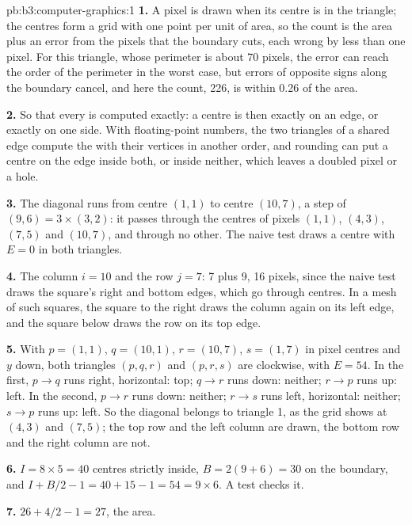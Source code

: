 \begin{solution}{pb:b3:computer-graphics:1}
\textbf{1.} A pixel is drawn when its centre is in the triangle; the centres form a grid with one point per unit of area, so the count is the area plus an error from the pixels that the boundary cuts, each wrong by less than one pixel. For this triangle, whose perimeter is about 70 pixels, the error can reach the order of the perimeter in the worst case, but errors of opposite signs along the boundary cancel, and here the count, 226, is within 0.26 of the area.

\textbf{2.} So that every  is computed exactly: a centre is then exactly on an edge, or exactly on one side. With floating-point numbers, the two triangles of a shared edge compute the  with their vertices in another order, and rounding can put a centre on the edge inside both, or inside neither, which leaves a doubled pixel or a hole.

\textbf{3.} The diagonal runs from centre $(1, 1)$ to centre $(10, 7)$, a step of $(9, 6) = 3 \times (3, 2)$: it passes through the centres of pixels $(1, 1)$, $(4, 3)$, $(7, 5)$ and $(10, 7)$, and through no other. The naive test draws a centre with $E = 0$ in both triangles.

\textbf{4.} The column $i = 10$ and the row $j = 7$: 7 plus 9, 16 pixels, since the naive test draws the square's right and bottom edges, which go through centres. In a mesh of such squares, the square to the right draws the column again on its left edge, and the square below draws the row on its top edge.

\textbf{5.} With $p = (1, 1)$, $q = (10, 1)$, $r = (10, 7)$, $s = (1, 7)$ in pixel centres and $y$ down, both triangles $(p, q, r)$ and $(p, r, s)$ are clockwise, with $E = 54$. In the first, $p \to q$ runs right, horizontal: top; $q \to r$ runs down: neither; $r \to p$ runs up: left. In the second, $p \to r$ runs down: neither; $r \to s$ runs left, horizontal: neither; $s \to p$ runs up: left. So the diagonal belongs to triangle 1, as the grid shows at $(4, 3)$ and $(7, 5)$; the top row and the left column are drawn, the bottom row and the right column are not.

\textbf{6.} $I = 8 \times 5 = 40$ centres strictly inside, $B = 2(9 + 6) = 30$ on the boundary, and $I + B/2 - 1 = 40 + 15 - 1 = 54 = 9 \times 6$. A test checks it.

\textbf{7.} $26 + 4/2 - 1 = 27$, the area.


\end{solution}
